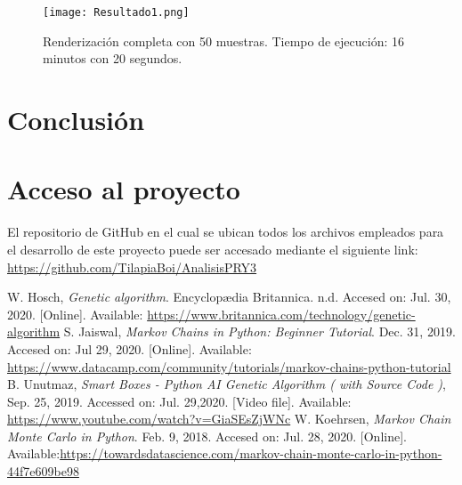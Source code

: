 \documentclass[conference]{IEEEtran}
\begin{document}
\begin{figure}[htbp]
\centerline{\texttt{[image: Resultado1.png]}}
\caption{Renderización completa con 50 muestras. Tiempo de ejecución: 16 minutos con 20 segundos.}
\label{50 muestras completo}
\end{figure}


\section{Conclusión}


\section{Acceso al proyecto}
El repositorio de GitHub en el cual se ubican todos los archivos empleados para el desarrollo de este proyecto puede ser accesado mediante el siguiente link: \url{https://github.com/TilapiaBoi/AnalisisPRY3}

\begin{thebibliography}{00}
 W. Hosch, \textit{Genetic algorithm}. Encyclopædia Britannica. n.d. Accesed on: Jul. 30, 2020. [Online]. Available: \url{https://www.britannica.com/technology/genetic-algorithm}
 S. Jaiswal, \textit{Markov Chains in Python: Beginner Tutorial}. Dec. 31, 2019. Accesed on: Jul 29, 2020. [Online]. Available: \url{https://www.datacamp.com/community/tutorials/markov-chains-python-tutorial}
 B. Unutmaz, \textit{Smart Boxes - Python AI Genetic Algorithm ( with Source Code )}, Sep. 25, 2019. Accessed on: Jul. 29,2020. [Video file]. Available: \url{ https://www.youtube.com/watch?v=GiaSEsZjWNc}
 W. Koehrsen, \textit{Markov Chain Monte Carlo in Python}. Feb. 9, 2018. Accesed on: Jul. 28, 2020. [Online]. Available:\url{https://towardsdatascience.com/markov-chain-monte-carlo-in-python-44f7e609be98}
\end{thebibliography}
\end{document}
